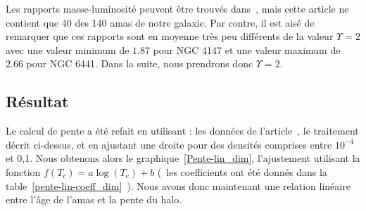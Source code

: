 	Les rapports masse-luminosité peuvent être trouvés dans~\cite{McL}, mais cette article ne contient que 40 des 140 amas de notre galaxie.
	Par contre, il est aisé de remarquer que ces rapports sont
	en moyenne très peu différents de la valeur $\Upsilon = 2$ avec une valeur minimum de $1.87$ pour NGC 4147 et une valeur maximum de
	$2.66$ pour NGC 6441. Dans la suite, nous prendrons donc $\Upsilon = 2$.


\subsection{Résultat}
	Le calcul de pente a été refait en utilisant : les données de l'article~\cite{TragerTable}, le traitement décrit ci-dessus, et en ajustant une
	droite pour des densités comprises entre $10^{-4}$ et 0,1.
	Nous obtenons alors le graphique~\ref{Pente-lin_dim}, l'ajustement utilisant la fonction
	$f(T_c) = a \log(T_c) + b$ (~les coefficients ont été donnés dans la table~\ref{pente-lin-coeff_dim}~).
	Nous avons donc maintenant une relation linéaire entre l'âge de l'amas et la pente du halo.

